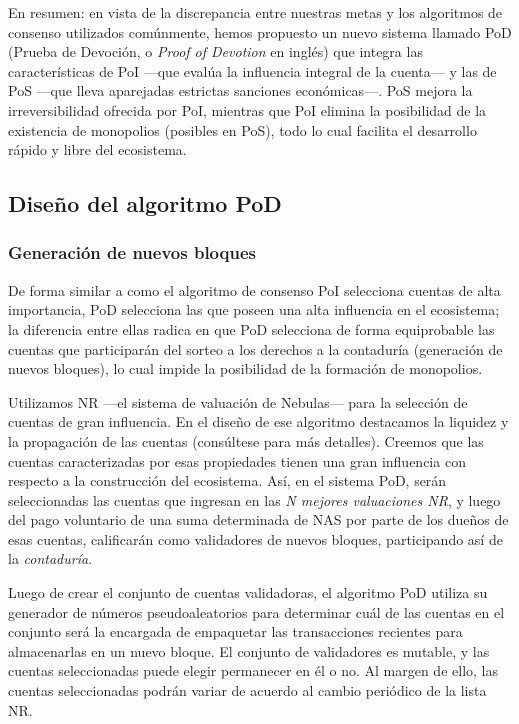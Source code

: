 En resumen: en vista de la discrepancia entre nuestras metas y los algoritmos de consenso utilizados comúnmente, hemos propuesto un nuevo sistema llamado PoD (Prueba de Devoción, o \textit{Proof of Devotion} en inglés) que integra las características de PoI —que evalúa la influencia integral de la cuenta— y las de PoS —que lleva aparejadas estrictas sanciones económicas—. PoS mejora la irreversibilidad ofrecida por PoI, mientras que PoI elimina la posibilidad de la existencia de monopolios (posibles en PoS), todo lo cual facilita el desarrollo rápido y libre del ecosistema.

\subsection{Diseño del algoritmo PoD}
\label{pod:design}

\subsubsection{Generación de nuevos bloques}
\label{pod:design:block}

De forma similar a como el algoritmo de consenso PoI selecciona cuentas de alta importancia, PoD selecciona las que poseen una alta influencia en el ecosistema; la diferencia entre ellas radica en que PoD selecciona de forma equiprobable las cuentas que participarán del sorteo a los derechos a la contaduría (generación de nuevos bloques), lo cual impide la posibilidad de la formación de monopolios.

Utilizamos NR —el sistema de valuación de Nebulas— para la selección de cuentas de gran influencia. En el diseño de ese algoritmo destacamos la liquidez y la propagación de las cuentas (consúltese  para más detalles). Creemos que las cuentas caracterizadas por esas propiedades tienen una gran influencia con respecto a la construcción del ecosistema. Así, en el sistema PoD, serán seleccionadas las cuentas que ingresan en las \textit{N mejores valuaciones NR}, y luego del pago voluntario de una suma determinada de NAS por parte de los dueños de esas cuentas, calificarán como validadores de nuevos bloques, participando así de la \textit{contaduría}.

Luego de crear el conjunto de cuentas validadoras, el algoritmo PoD utiliza su generador de números pseudoaleatorios para determinar cuál de las cuentas en el conjunto será la encargada de empaquetar las transacciones recientes para almacenarlas en un nuevo bloque. El conjunto de validadores es mutable, y las cuentas seleccionadas puede elegir permanecer en él o no. Al margen de ello, las cuentas seleccionadas podrán variar de acuerdo al cambio periódico de la lista NR.


